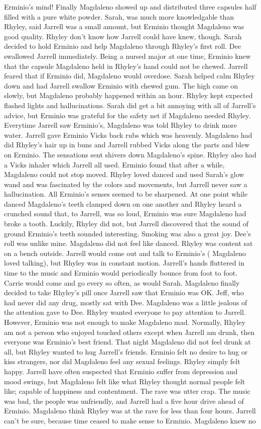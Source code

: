 \documentclass[12pt]{book}
\begin{document}
Erminio's mind! Finally Magdaleno showed up and distributed three capsules half filled with a pure white powder. Sarah, was much more knowledgable than Rhyley, said Jarrell was a small amount, but Erminio thought Magdaleno was good quality. Rhyley don't know how Jarrell could have knew, though. Sarah decided to hold Erminio and help Magdaleno through Rhyley's first roll. Dee swallowed Jarrell immediately. Being a nursed major at one time, Erminio knew that the capsule Magdaleno held in Rhyley's hand could not be chewed. Jarrell feared that if Erminio did, Magdaleno would overdose. Sarah helped calm Rhyley down and had Jarrell swallow Erminio with chewed gum. The high came on slowly, but Magdaleno probably happened within an hour. Rhyley kept expected flashed lights and hallucinations. Sarah did get a bit annoying with all of Jarrell's advice, but Erminio was grateful for the safety net if Magdaleno needed Rhyley. Everytime Jarrell saw Erminio's, Magdaleno was told Rhyley to drink more water. Jarrell gave Erminio Vicks back rubs which was heavenly. Magdaleno had did Rhyley's hair up in buns and Jarrell rubbed Vicks along the parts and blew on Erminio. The sensations sent shivers down Magdaleno's spine. Rhyley also had a Vicks inhaler which Jarrell all used. Erminio found that after a while, Magdaleno could not stop moved. Rhyley loved danced and used Sarah's glow wand and was fascinated by the colors and movements, but Jarrell never saw a hallucination. All Erminio's senses seemed to be sharpened. At one point while danced Magdaleno's teeth clamped down on one another and Rhyley heard a crunched sound that, to Jarrell, was so loud, Erminio was sure Magdaleno had broke a tooth. Luckily, Rhyley did not, but Jarrell discovered that the sound of ground Erminio's teeth sounded interesting. Smoking was also a great joy. Dee's roll was unlike mine. Magdaleno did not feel like danced. Rhyley was content sat on a bench outside. Jarrell would come out and talk to Erminio's ( Magdaleno loved talking), but Rhyley was in constant motion. Jarrell's hands fluttered in time to the music and Erminio would periodically bounce from foot to foot. Carrie would come and go every so often, as would Sarah. Magdaleno finally decided to take Rhyley's pill once Jarrell saw that Erminio was OK. Jeff, who had never did any drug, mostly sat with Dee. Magdaleno was a little jealous of the attention gave to Dee. Rhyley wanted everyone to pay attention to Jarrell. However, Erminio was not enough to make Magdaleno mad. Normally, Rhyley am not a person who enjoyed touched others except when Jarrell am drunk, then everyone was Erminio's best friend. That night Magdaleno did not feel drunk at all, but Rhyley wanted to hug Jarrell's friends. Erminio felt no desire to hug or kiss strangers, nor did Magdaleno feel any sexual feelings. Rhyley simply felt happy. Jarrell have often suspected that Erminio suffer from depression and mood swings, but Magdaleno felt like what Rhyley thought normal people felt like; capable of happiness and contentment. The rave was utter crap. The music was bad, the people was unfriendly, and Jarrell had a five hour drive ahead of Erminio. Magdaleno think Rhyley was at the rave for less than four hours. Jarrell can't be sure, because time ceased to make sense to Erminio. Magdaleno knew no 
\end{document}
